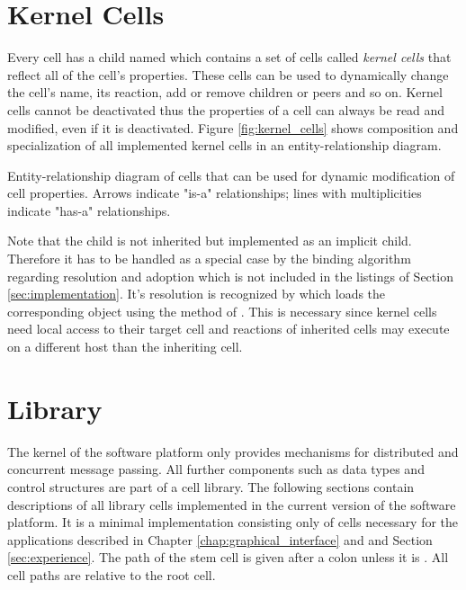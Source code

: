\section{Kernel Cells}
\label{sec:kernel_cells}

Every cell has a child named  which contains a set of cells called \textit{kernel cells} that reflect all of the cell's properties. These cells can be used to dynamically change the cell's name, its reaction, add or remove children or peers and so on. Kernel cells cannot be deactivated thus the properties of a cell can always be read and modified, even if it is deactivated. Figure \ref{fig:kernel_cells} shows composition and specialization of all implemented kernel cells in an entity-relationship diagram.

{Entity-relationship diagram of cells that can be used for dynamic modification of cell properties. Arrows indicate "is-a" relationships; lines with multiplicities indicate "has-a" relationships.}

Note that the child  is not inherited but implemented as an implicit child. Therefore it has to be handled as a special case by the binding algorithm regarding resolution and adoption which is not included in the listings of Section \ref{sec:implementation}. It's resolution is recognized by  which loads the corresponding  object using the  method of . This is necessary since kernel cells need local access to their target cell and reactions of inherited cells may execute on a different host than the inheriting cell.

\section{Library}
\label{sec:library}

The kernel of the software platform only provides mechanisms for distributed and concurrent message passing. All further components such as data types and control structures are part of a cell library. The following sections contain descriptions of all library cells implemented in the current version of the software platform. It is a minimal implementation consisting only of cells necessary for the applications described in Chapter \ref{chap:graphical_interface} and and Section \ref{sec:experience}. The path of the stem cell is given after a colon unless it is . All cell paths are relative to the root cell.

